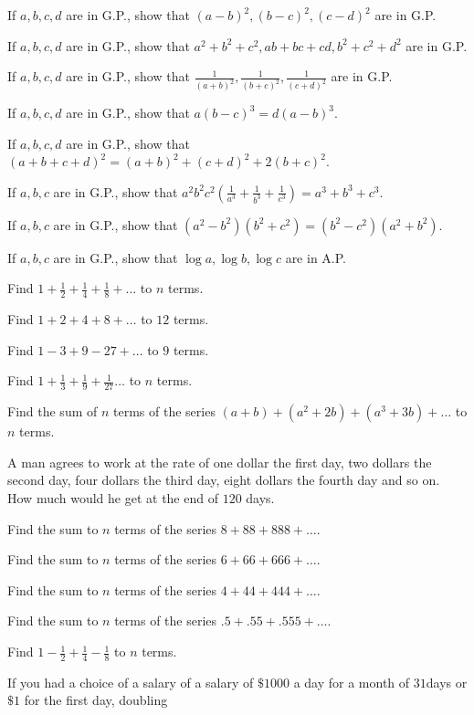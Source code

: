 \item If $a, b, c, d$ are in G.P., show that $(a - b)^2, (b - c)^2, (c - d)^2$ are in G.P.
\item If $a, b, c, d$ are in G.P., show that $a^2 + b^2 + c^2, ab + bc + cd, b^2 + c^2 + d^2$ are in G.P.
\item If $a, b, c, d$ are in G.P., show that $\frac{1}{(a + b)^2}, \frac{1}{(b + c)^2}, \frac{1}{(c + d)^2}$ are in G.P.
\item If $a, b, c, d$ are in G.P., show that $a(b - c)^3 = d(a - b)^3$.
\item If $a, b, c, d$ are in G.P., show that $(a + b + c + d)^2 = (a + b)^2 + (c + d)^2 + 2(b + c)^2$.
\item If $a, b, c$ are in G.P., show that $a^2b^2c^2\left(\frac{1}{a^3} + \frac{1}{b^3} + \frac{1}{c^3}\right) = a^3 + b^3 + c^3$.
\item If $a, b, c$ are in G.P., show that $(a^2 - b^2)(b^2 + c^2) = (b^2 - c^2)(a^2 + b^2)$.
\item If $a, b, c$ are in G.P., show that $\log a, \log b, \log c$ are in A.P.
\item Find $1 + \frac{1}{2} + \frac{1}{4} + \frac{1}{8} + \ldots$ to $n$ terms.
\item Find $1 + 2 + 4 + 8 + \ldots$ to $12$ terms.
\item Find $1 - 3 + 9 - 27 + \ldots$ to $9$ terms.
\item Find $1 + \frac{1}{3} + \frac{1}{9} + \frac{1}{27} \ldots$ to $n$ terms.
\item Find the sum of $n$ terms of the series $(a + b) + (a^2 + 2b) + (a^3 + 3b) + \ldots$ to $n$ terms.
\item A man agrees to work at the rate of one dollar the first day, two dollars the second day, four dollars the third day, eight
  dollars the fourth day and so on. How much would he get at the end of $120$ days.
\item Find the sum to $n$ terms of the series $8 + 88 + 888 + \ldots$.
\item  Find the sum to $n$ terms of the series $6 + 66 + 666 + \ldots$.
\item Find the sum to $n$ terms of the series $4 + 44 + 444 + \ldots$.
\item Find the sum to $n$ terms of the series $.5 + .55 + .555 + \ldots$.
\item Find $1 - \frac{1}{2} + \frac{1}{4} - \frac{1}{8}$ to $n$ terms.
\item If you had a choice of a salary of a salary of $\$ 1000$ a day for a month of $31$days or $\$ 1$ for the first day, doubling
